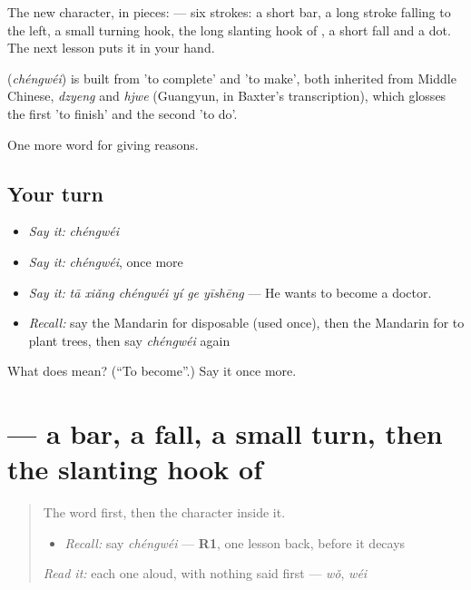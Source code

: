 The new character, in pieces:  — six strokes: a short bar, a long stroke falling to the left, a small turning hook, the long slanting hook of , a short fall and a dot. The next lesson puts it in your hand.

\begin{cousinweb}
\textbf{} (\emph{chéngwéi}) is built from  'to complete' and  'to make', both inherited from Middle Chinese, \emph{dzyeng} and \emph{hjwe} (Guangyun, in Baxter's transcription), which glosses the first 'to finish' and the second 'to do'.
\end{cousinweb}

\begin{grammarlens}[title={What you've built}]
One more word for giving reasons.
\end{grammarlens}

\subsection*{Your turn}
\begin{itemize}
\raggedright
  \item \emph{Say it:} \emph{chéngwéi}
  \item \emph{Say it:} \emph{chéngwéi}, once more
  \item \emph{Say it:} \emph{tā xiǎng chéngwéi yí ge yīshēng} — He wants to become a doctor.
  \item \emph{Recall:} say the Mandarin for disposable (used once), then the Mandarin for to plant trees, then say \emph{chéngwéi} again
\end{itemize}

\begin{tcolorbox}[breakable,colback=teal!4,colframe=teal!35!black,title={Before you move on}]
What does  mean? (\textquotedblleft{}To become\textquotedblright{}.) Say it once more.
\end{tcolorbox}
\section[\texorpdfstring{\zh{成} (chéng)}{成 (chéng)}]{ — a bar, a fall, a small turn, then the slanting hook of }

\label{lesson:ZH-W384-cheng-become}



\begin{quote}
The word first, then the character inside it.

\begin{itemize}
\raggedright
  \item \emph{Recall:} say \emph{chéngwéi} — \textbf{R1}, one lesson back, before it decays
\end{itemize}

\begin{quote}
 
\end{quote}

\emph{Read it:} each one aloud, with nothing said first — \emph{wǒ}, \emph{wéi}
\end{quote}

